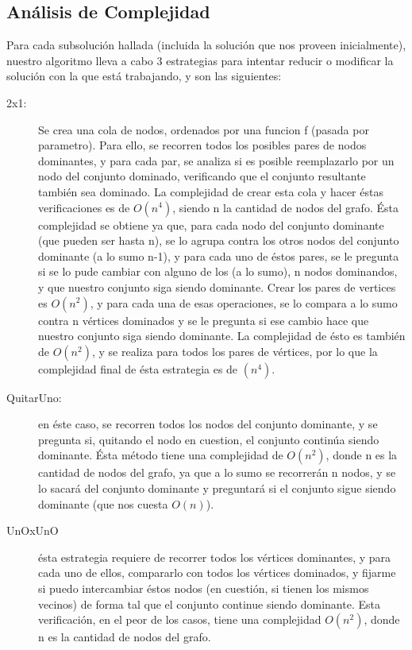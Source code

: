 \subsection{Análisis de Complejidad}
Para cada subsolución hallada (incluida la solución que nos proveen inicialmente), nuestro algoritmo lleva a cabo 3 estrategias para intentar reducir o modificar la solución con la que está trabajando, y son las siguientes:
\begin{description}
\item[2x1:] Se crea una cola de nodos, ordenados por una funcion f (pasada por parametro). Para ello, se recorren todos los posibles pares de nodos dominantes, y para cada par, se analiza si es posible reemplazarlo por un nodo del conjunto dominado, verificando que el conjunto resultante también sea dominado. La complejidad de crear esta cola y hacer éstas verificaciones es de $O(n^4)$, siendo n la cantidad de nodos del grafo. Ésta complejidad se obtiene ya que, para cada nodo del conjunto dominante (que pueden ser hasta n), se lo agrupa contra los otros nodos del conjunto dominante (a lo sumo n-1), y para cada uno de éstos pares, se le pregunta si se lo pude cambiar con alguno de los (a lo sumo), n nodos dominandos, y que nuestro conjunto siga siendo dominante. Crear los pares de vertices es $O(n^2)$, y para cada una de esas operaciones, se lo compara a lo sumo contra n vértices dominados y se le pregunta si ese cambio hace que nuestro conjunto siga siendo dominante. La complejidad de ésto es también de $O(n^2)$, y se realiza para todos los pares de vértices, por lo que la complejidad final de ésta estrategia es de $(n^4)$.
\item[QuitarUno:] en éste caso, se recorren todos los nodos del conjunto dominante, y se pregunta si, quitando el nodo en cuestion, el conjunto continúa siendo dominante. Ésta método tiene una complejidad de $O(n^2)$, donde n es la cantidad de nodos del grafo, ya que a lo sumo se recorrerán n nodos, y se lo sacará del conjunto dominante y preguntará si el conjunto sigue siendo dominante (que nos cuesta $O(n)$).
 \item[UnOxUnO] ésta estrategia requiere de recorrer todos los vértices dominantes, y para cada uno de ellos, compararlo con todos los vértices dominados, y fijarme si puedo intercambiar éstos nodos (en cuestión, si tienen los mismos vecinos) de forma tal que el conjunto continue siendo dominante. Esta verificación, en el peor de los casos, tiene una complejidad $O(n^2)$, donde n es la cantidad de nodos del grafo.
\end{description}
 
